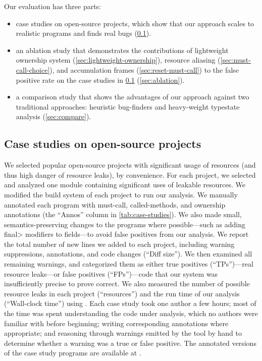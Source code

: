 Our evaluation has three parts:
\begin{itemize}
\item case studies on open-source projects, which show that our approach
  scales to realistic programs and finds real bugs (\cref{sec:case-studies}).
\item an ablation study that demonstrates the contributions of
  lightweight ownership system (\cref{sec:lightweight-ownership}),
  resource aliasing (\cref{sec:must-call-choice}), and
  accumulation frames (\cref{sec:reset-must-call}) to the false positive
  rate on the case studies in \cref{sec:case-studies} (\cref{sec:ablation}).
\item a comparison study that shows the advantages of our approach against
  two traditional approaches: heuristic bug-finders and heavy-weight
  typestate analysis (\cref{sec:compare}).
\end{itemize}

\subsection{Case studies on open-source projects}
\label{sec:case-studies}

We selected  popular open-source projects with significant
usage of resources (and thus high danger of resource leaks), by
convenience.  For each project, we selected and analyzed one module
containing significant uses of leakable resources.  We modified the
build system of each project to run our analysis. We manually
annotated each program with must-call, called-methods, and ownership
annotations (the ``Annos'' column in \cref{tab:case-studies}). We also
made small, semantics-preserving changes to the programs where
possible---such as adding \<final> modifiers to fields---to avoid
false positives from our analysis. We report the total number
of new lines we added to each project, including warning suppressions,
annotations, and code changes (``Diff size''). We then examined
all remaining warnings, and categorized them as either true positives
(``TPs'')---real resource leaks---or false positives (``FPs'')---code
that our system was insufficiently precise to prove correct.
We also measured the number of
possible resource leaks in each project (``resources'') and the run
time of our analysis (``Wall-clock time'') using . Each case
study took one author a few hours; most of the time was spent
understanding the code under analysis, which no authors were familiar
with before beginning; writing corresponding annotations where
appropriate; and reasoning through warnings emitted by the tool by
hand to determine whether a warning was a true or false positive.  The
annotated versions of the case study programs are available at
.

